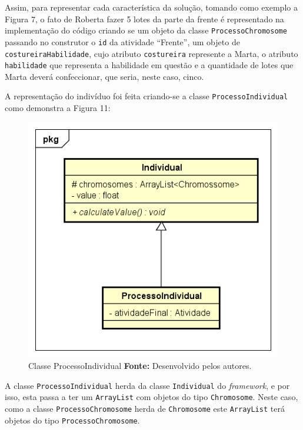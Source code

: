 \par Assim, para representar cada característica da solução, tomando como
exemplo a Figura 7, o fato de Roberta fazer 5 lotes da parte da frente é representado na implementação
do código criando se um objeto da classe \texttt{ProcessoChromosome} passando no
construtor o \texttt{id} da atividade ``Frente'', um objeto de
\texttt{costureiraHabilidade}, cujo atributo \texttt{costureira} represente a
Marta, o atributo \texttt{habilidade} que representa a habilidade em questão e a
quantidade de lotes que Marta deverá confeccionar, que seria, neste caso, cinco.

\par A representação do indivíduo foi feita criando-se a classe \texttt{ProcessoIndividual} 
como demonstra a Figura 11:


\begin{figure}[h!]
	\centerline{\includegraphics[scale=0.9]{./imagens/class_individual.png}}
	\caption[Classe ProcessoIndividual]
	{Classe ProcessoIndividual \textbf{Fonte:} Desenvolvido pelos autores.}
	\label{fig:exemplo1}
\end{figure}

\par A classe \texttt{ProcessoIndividual} herda da classe \texttt{Individual} do
\textit{framework}, e por isso, esta passa a ter um \texttt{ArrayList} com
objetos do tipo \texttt{Chromosome}. Neste caso, como a classe \texttt{ProcessoChromosome} herda de \texttt{Chromosome} 
este \texttt{ArrayList} terá objetos do tipo \texttt{ProcessoChromosome}.

